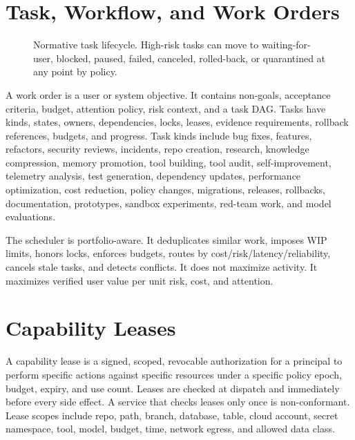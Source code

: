 \documentclass[journal,onecolumn]{IEEEtran}
\begin{document}
\section{Task, Workflow, and Work Orders}
\begin{figure}[t]
\centering
{}
\caption{Normative task lifecycle. High-risk tasks can move to waiting-for-user, blocked, paused, failed, canceled, rolled-back, or quarantined at any point by policy.}
\end{figure}

A work order is a user or system objective. It contains non-goals, acceptance criteria, budget, attention policy, risk context, and a task DAG. Tasks have kinds, states, owners, dependencies, locks, leases, evidence requirements, rollback references, budgets, and progress. Task kinds include bug fixes, features, refactors, security reviews, incidents, repo creation, research, knowledge compression, memory promotion, tool building, tool audit, self-improvement, telemetry analysis, test generation, dependency updates, performance optimization, cost reduction, policy changes, migrations, releases, rollbacks, documentation, prototypes, sandbox experiments, red-team work, and model evaluations.

The scheduler is portfolio-aware. It deduplicates similar work, imposes WIP limits, honors locks, enforces budgets, routes by cost/risk/latency/reliability, cancels stale tasks, and detects conflicts. It does not maximize activity. It maximizes verified user value per unit risk, cost, and attention.

\section{Capability Leases}
A capability lease is a signed, scoped, revocable authorization for a principal to perform specific actions against specific resources under a specific policy epoch, budget, expiry, and use count. Leases are checked at dispatch and immediately before every side effect. A service that checks leases only once is non-conformant. Lease scopes include repo, path, branch, database, table, cloud account, secret namespace, tool, model, budget, time, network egress, and allowed data class.
\end{document}
